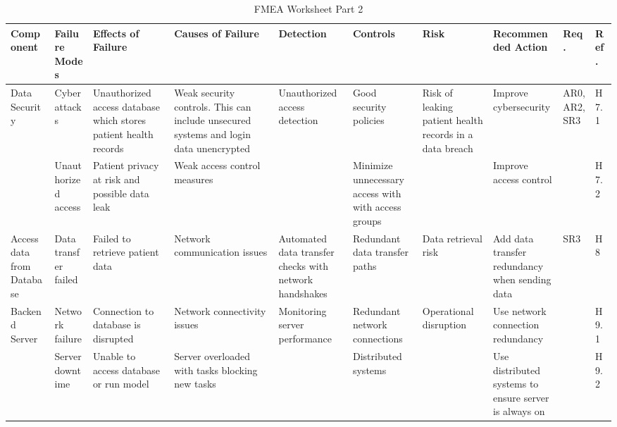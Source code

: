 \documentclass{article}
\begin{document}
\begin{landscape}
  \begin{table}[hp]
    \caption{FMEA Worksheet Part 2} \label{FMEA}
    \centering
    \begin{footnotesize}
      \begin{tabular}{|p{1in}|p{1in}|p{1in}|p{1.5in}|p{0.6in}|p{0.8in}|p{0.7in}|p{1.8in}|p{0.2in}|p{0.2in}|}
        \toprule
        \textbf{Component} & \textbf{Failure Modes} & \textbf{Effects of Failure} &
        \textbf{Causes of Failure} & \textbf{Detection} & \textbf{Controls} & \textbf{Risk} &
        \textbf{Recommended Action} & \textbf{Req.} & \textbf{Ref.} \\
        \bottomrule

        \multirow{2}{1in}{Data Security} &
        Cyberattacks &
        Unauthorized access database which stores patient health records &
        Weak security controls. This can include unsecured systems and login data unencrypted &
        \multirow{2}{0.6in}{Unauthorized access detection} &
        Good security policies &
        \multirow{2}{0.8in}{Risk of leaking patient health records in a data breach} &
        Improve cybersecurity &
        \multirow{2}{0.2in}{AR0, AR2, SR3} &
        H7.1 \\
        \cline{2-4}\cline{6-6}\cline{8-8}\cline{10-10}
        &
        Unauthorized access &
        Patient privacy at risk and possible data leak &
        Weak access control measures & &
        Minimize unnecessary access with with access groups & &
        Improve access control & &
        H7.2 \\
        \hline

        Access data from Database &
        Data transfer failed &
        Failed to retrieve patient data &
        Network communication issues &
        Automated data transfer checks with network handshakes &
        Redundant data transfer paths &
        Data retrieval risk &
        Add data transfer redundancy when sending data &
        SR3 &
        H8 \\
        \hline

        \multirow{2}{1in}{Backend Server} &
        Network failure &
        Connection to database is disrupted &
        Network connectivity issues &
        \multirow{2}{0.6in}{Monitoring server performance} &
        Redundant network connections &
        \multirow{2}{0.9in}{Operational disruption} &
        Use network connection redundancy & &
        H9.1 \\
        \cline{2-4}\cline{6-6}\cline{8-8}\cline{10-10}
        &
        Server downtime &
        Unable to access database or run model &
        Server overloaded with tasks blocking new tasks & &
        Distributed systems & &
        Use distributed systems to ensure server is always on & &
        H9.2 \\
        \hline


\end{tabular}
\end{footnotesize}
\end{table}
\end{landscape}
\end{document}
